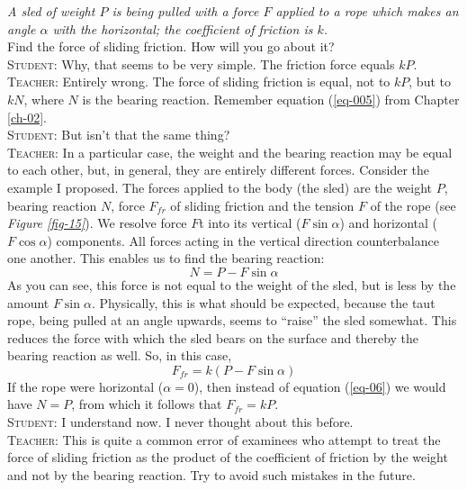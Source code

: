 \documentclass[a4paper,sfsidenotes]{tufte-book}
\begin{document}
\emph{A sled of weight $P$ is being pulled with a force $F$ applied to a rope which makes an angle $\alpha$ with the horizontal; the coefficient of friction is $k$.}\\
 Find the force of sliding friction. How will you go about it?
\\
\textsc{Student:} Why, that seems to be very simple. The friction force equals $kP$.
\\
\textsc{Teacher:} Entirely wrong. The force of sliding friction is equal, not to $kP$, but to $kN$, where $N$ is the bearing reaction. Remember equation (\ref{eq-005}) from  Chapter \ref{ch-02}.
\\
\textsc{Student:} But isn't that the same thing?
\\
\textsc{Teacher:} In a particular case, the weight and the bearing reaction may be equal to each other, but, in general, they are entirely different forces. Consider the example I proposed. The forces applied to the body (the sled) are the weight $P$, bearing reaction $N$, force $F_{fr}$ of sliding friction and the tension $F$ of the rope (see \emph{Figure \ref{fig-15}}). We resolve force $F$t into its vertical ($F \sin \alpha$) and horizontal ($F \cos \alpha$) components. All forces acting in the vertical direction counterbalance one another. This enables us to find the bearing reaction: 
\begin{equation}
N = P - F \sin \alpha
\label{eq-06}
\end{equation}
As you can see, this force is not equal to the weight of the sled, but is less by the amount $F \sin \alpha$. Physically, this is what should be expected, because the taut rope, being pulled at an angle upwards, seems to ``raise'' the sled somewhat. This reduces the force with which the sled bears on the surface
and thereby the bearing reaction as well. So, in this case, 
\begin{equation}
F_{fr}=k(P - F \sin \alpha)
\label{eq-07}
\end{equation}
If the rope were horizontal ($\alpha=0$), then instead of equation (\ref{eq-06}) we would have $N=P$, from which it follows that $F_{fr}=kP$.
\\
\textsc{Student:} I understand now. I never thought about this before.
\\
\textsc{Teacher:} This is quite a common error of examinees who attempt to treat the force of sliding friction as the product of the coefficient of friction by the weight and not by the bearing reaction. Try to avoid such mistakes in the future.
\\
\end{document}
